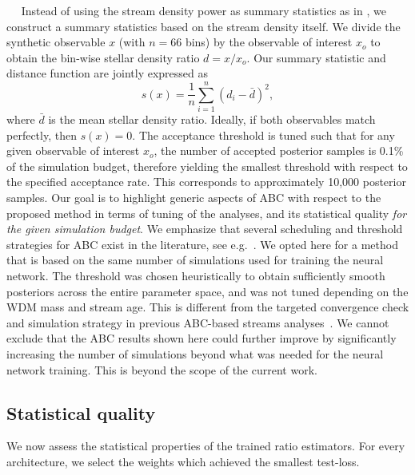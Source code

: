 \documentclass[fleqn,usenatbib]{mnras}
\begin{document}
\bigskip

~~
Instead of using the stream density power as summary statistics as in \citet{Bovy2016a,banik2019evidence}, we construct a summary statistics based on the stream density itself. We divide the synthetic observable $x$ (with $n = 66$ bins)
by the observable of interest $x_o$
to obtain the
bin-wise stellar density ratio $d = x / x_o$.
Our summary statistic and distance function are jointly expressed as
\begin{equation}
    s(x) = \frac{1}{n}\sum_{i=1}^{n} (d_i - \bar{d})^2,
\end{equation}
where $\bar{d}$ is the mean stellar density ratio.
Ideally, if both observables match perfectly, then $s(x) = 0$.
The acceptance threshold is tuned such that for any given observable of interest $x_o$,
the number of accepted posterior samples is 0.1\% of the simulation budget,
therefore yielding the smallest threshold with respect to the specified acceptance rate.
This corresponds to approximately 10,000 posterior samples.
Our goal is to 
highlight generic aspects of ABC with respect to the proposed method in terms of tuning of the analyses,
and its statistical quality \emph{for the given simulation budget}.
We emphasize that several scheduling and threshold strategies for ABC exist in the literature, see e.g.~\citep{Lintusaari2017-zn, Prangle2017-pe}. We opted here for a method that is based on the same number of simulations used for training the neural network.  The threshold was chosen heuristically to obtain sufficiently smooth posteriors across the entire parameter space, and was not tuned depending on the WDM mass and stream age.  This is different from the targeted convergence check and simulation strategy in previous ABC-based streams analyses~\citep{Bovy2016a,banik2018probing, bovy2019constraining, banik2019novel}.  We cannot exclude that the ABC results shown here could further improve by significantly increasing the number of simulations beyond what was needed for the neural network training.  This is beyond the scope of the current work.

\subsection{Statistical quality}
\label{sec:statistical_query}
We now assess the statistical properties of the trained ratio estimators.
For every architecture, we select the weights
which achieved the smallest test-loss.
\end{document}
